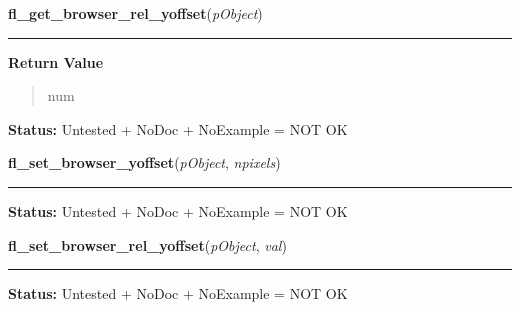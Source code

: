     \vspace{0.5ex}

\hspace{.8\funcindent}\begin{boxedminipage}{\funcwidth}

    \raggedright \textbf{fl\_get\_browser\_rel\_yoffset}(\textit{pObject})

    \vspace{-1.5ex}

    \rule{\textwidth}{0.5\fboxrule}
\setlength{\parskip}{2ex}
\setlength{\parskip}{1ex}
      \textbf{Return Value}
    \vspace{-1ex}

      \begin{quote}
      num

      \end{quote}

\textbf{Status:} Untested + NoDoc + NoExample = NOT OK



    \end{boxedminipage}

    \label{xformslib:library:fl_set_browser_yoffset}

    \vspace{0.5ex}

\hspace{.8\funcindent}\begin{boxedminipage}{\funcwidth}

    \raggedright \textbf{fl\_set\_browser\_yoffset}(\textit{pObject}, \textit{npixels})

    \vspace{-1.5ex}

    \rule{\textwidth}{0.5\fboxrule}
\setlength{\parskip}{2ex}
\setlength{\parskip}{1ex}
\textbf{Status:} Untested + NoDoc + NoExample = NOT OK



    \end{boxedminipage}

    \label{xformslib:library:fl_set_browser_rel_yoffset}

    \vspace{0.5ex}

\hspace{.8\funcindent}\begin{boxedminipage}{\funcwidth}

    \raggedright \textbf{fl\_set\_browser\_rel\_yoffset}(\textit{pObject}, \textit{val})

    \vspace{-1.5ex}

    \rule{\textwidth}{0.5\fboxrule}
\setlength{\parskip}{2ex}
\setlength{\parskip}{1ex}
\textbf{Status:} Untested + NoDoc + NoExample = NOT OK



    \end{boxedminipage}

